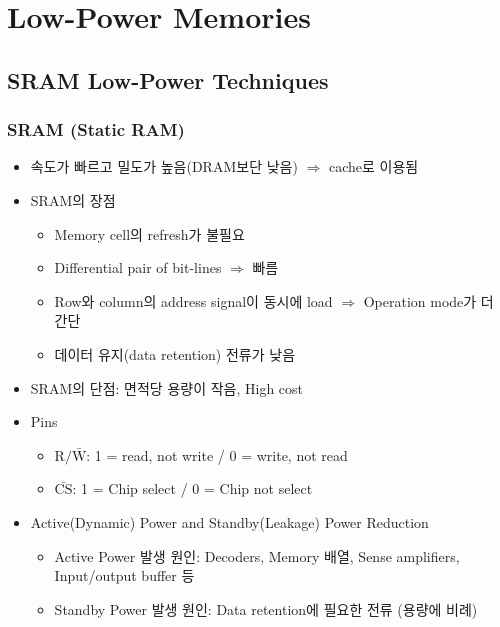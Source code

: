 \section{Low-Power Memories}

\subsection{SRAM Low-Power Techniques}

\subsubsection*{SRAM (Static RAM)}
\begin{itemize}
    \item 속도가 빠르고 밀도가 높음(DRAM보단 낮음) $\Rightarrow$ cache로 이용됨
    \item SRAM의 장점
    \begin{itemize}
        \item Memory cell의 refresh가 불필요
        \item Differential pair of bit-lines $\Rightarrow$ 빠름
        \item Row와 column의 address signal이 동시에 load $\Rightarrow$ Operation mode가 더 간단
        \item 데이터 유지(data retention) 전류가 낮음
    \end{itemize}
    \item SRAM의 단점: 면적당 용량이 작음, High cost
    \item Pins
    \begin{itemize}
        \item $\mathrm{R/\bar{W}}$: 1 = read, not write / 0 = write, not read
        \item $\mathrm{\bar{CS}}$: 1 = Chip select / 0 = Chip not select
    \end{itemize}
    \item Active(Dynamic) Power and Standby(Leakage) Power Reduction
    \begin{itemize}
        \item Active Power 발생 원인: Decoders, Memory 배열, Sense amplifiers, Input/output buffer 등
        \item Standby Power 발생 원인: Data retention에 필요한 전류 (용량에 비례)
    \end{itemize}
\end{itemize}

